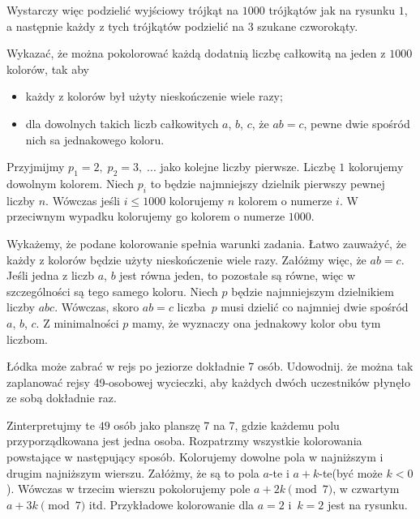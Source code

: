 \noindent
Wystarczy więc podzielić wyjściowy trójkąt na $1000$ trójkątów jak na rysunku $1$, a następnie każdy z tych trójkątów podzielić na $3$ szukane czworokąty.

\vspace{10px}

\begin{problem}{4} 
	Wykazać, że można pokolorować każdą dodatnią liczbę całkowitą na jeden z $1000$ kolorów, tak aby
	\begin{itemize}
		\item każdy z kolorów był użyty nieskończenie wiele razy;
		\item dla dowolnych takich liczb całkowitych $a$, $b$, $c$, że $ab = c$, pewne dwie spośród nich sa jednakowego koloru.
	\end{itemize} 
\end{problem}

\vspace{5px}

\noindent
Przyjmijmy $p_1 = 2,\; p_2 = 3, \; ...$ jako kolejne liczby pierwsze. Liczbę $1$ kolorujemy dowolnym kolorem. Niech $p_i$ to będzie najmniejszy dzielnik pierwszy pewnej liczby $n$. Wówczas jeśli $i \leqslant 1000$ kolorujemy $n$ kolorem o numerze $i$. W przeciwnym wypadku kolorujemy go kolorem o numerze $1000$.

\vspace{5px}

\noindent
Wykażemy, że podane kolorowanie spełnia warunki zadania. Łatwo zauważyć, że każdy z kolorów będzie użyty nieskończenie wiele razy. Załóżmy więc, że $ab = c$. Jeśli jedna z liczb $a$, $b$ jest równa jeden, to pozostałe są równe, więc w szczególności są tego samego koloru. Niech $p$ będzie najmniejszym dzielnikiem liczby $abc$. Wówczas, skoro $ab = c$ liczba~$p$ musi dzielić co najmniej dwie spośród $a$, $b$, $c$. Z minimalności $p$ mamy, że wyznaczy ona jednakowy kolor obu tym liczbom.

\vspace{10px}

\begin{problem}{5}
	Łódka może zabrać w rejs po jeziorze dokładnie 7 osób. Udowodnij. że można tak zaplanować rejsy 49-osobowej wycieczki, aby każdych dwóch uczestników płynęło ze sobą dokładnie raz.
\end{problem}

\noindent
Zinterpretujmy te $49$ osób jako planszę 7 na 7, gdzie każdemu polu przyporządkowana jest jedna osoba. Rozpatrzmy wszystkie kolorowania powstające w następujący sposób. Kolorujemy dowolne pola w najniższym i drugim najniższym wierszu. Załóżmy, że są to pola $a$-te i $a + k$-te(być może $k < 0$). Wówczas w trzecim wierszu pokolorujemy pole $a + 2k \pmod{7}$, w czwartym $a + 3k \pmod{7}$ itd. Przykładowe kolorowanie dla $a = 2$ i~$k = 2$ jest na rysunku.


